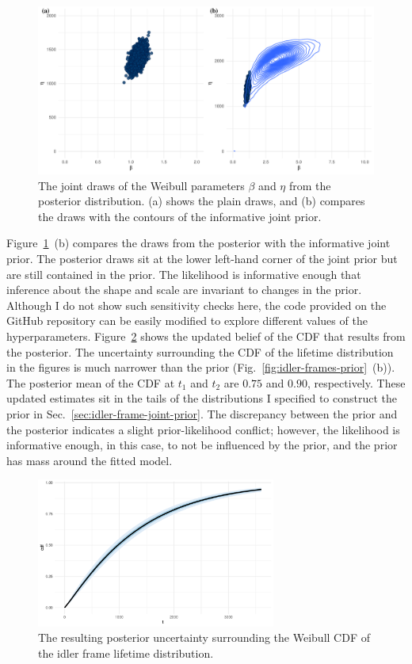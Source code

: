 \begin{figure}
  \centering
  \includegraphics[width=1\textwidth]{./figures/ch-3/idler-frame-post.pdf}
  \caption{The joint draws of the Weibull parameters $\beta$ and $\eta$ from the posterior distribution. (a) shows the plain draws, and (b) compares the draws with the contours of the informative joint prior.}
  \label{fig:idler-frames-post}
\end{figure}

Figure~\ref{fig:idler-frames-post}~(b) compares the draws from the posterior with the informative joint prior. The posterior draws sit at the lower left-hand corner of the joint prior but are still contained in the prior. The likelihood is informative enough that inference about the shape and scale are invariant to changes in the prior. Although I do not show such sensitivity checks here, the code provided on the GitHub repository can be easily modified to explore different values of the hyperparameters. Figure~\ref{fig:idler-frames-post-cdf} shows the updated belief of the CDF that results from the posterior. The uncertainty surrounding the CDF of the lifetime distribution in the figures is much narrower than the prior (Fig.~\ref{fig:idler-frames-prior}~(b)). The posterior mean of the CDF at $t_1$ and $t_2$ are $0.75$ and $0.90$, respectively. These updated estimates sit in the tails of the distributions I specified to construct the prior in Sec.~\ref{sec:idler-frame-joint-prior}. The discrepancy between the prior and the posterior indicates a slight prior-likelihood conflict; however, the likelihood is informative enough, in this case, to not be influenced by the prior, and the prior has mass around the fitted model.

\begin{figure}
  \centering
  \includegraphics[width=0.7\textwidth]{./figures/ch-3/idler-frame-post-CDF.pdf}
  \caption{The resulting posterior uncertainty surrounding the Weibull CDF of the idler frame lifetime distribution.}
  \label{fig:idler-frames-post-cdf}
\end{figure}

